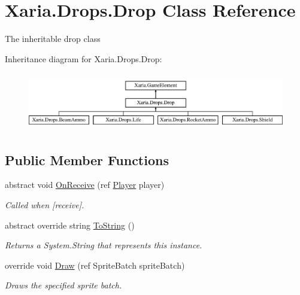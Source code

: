 \hypertarget{classXaria_1_1Drops_1_1Drop}{}\section{Xaria.\+Drops.\+Drop Class Reference}
\label{classXaria_1_1Drops_1_1Drop}


The inheritable drop class  


Inheritance diagram for Xaria.\+Drops.\+Drop\+:\begin{figure}[H]
\begin{center}
\leavevmode
\includegraphics[height=2.545455cm]{classXaria_1_1Drops_1_1Drop}
\end{center}
\end{figure}
\subsection*{Public Member Functions}
\begin{DoxyCompactItemize}
\item 
abstract void \hyperlink{classXaria_1_1Drops_1_1Drop_abb5544bb56ff889f557888bd9e86f7cb}{On\+Receive} (ref \hyperlink{classXaria_1_1Player}{Player} player)
\begin{DoxyCompactList}\small\item\em Called when \mbox{[}receive\mbox{]}. \end{DoxyCompactList}\item 
abstract override string \hyperlink{classXaria_1_1Drops_1_1Drop_abe25441e5c3fe5b2199352f24bfafa4b}{To\+String} ()
\begin{DoxyCompactList}\small\item\em Returns a System.\+String that represents this instance. \end{DoxyCompactList}\item 
override void \hyperlink{classXaria_1_1Drops_1_1Drop_a2cd5c3912ae653526a7cc25aefa691b0}{Draw} (ref Sprite\+Batch sprite\+Batch)
\begin{DoxyCompactList}\small\item\em Draws the specified sprite batch. \end{DoxyCompactList}\end{DoxyCompactItemize}

